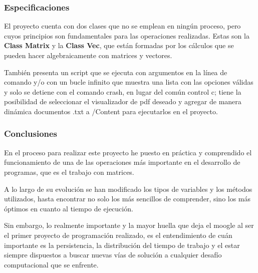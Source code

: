 \documentclass{beamer}
\begin{document}
\begin{frame}
    \frametitle{Especificaciones}
    El proyecto cuenta con dos clases que no se emplean en ningún proceso, pero cuyos principios son 
    fundamentales para las operaciones realizadas. Estas son la \textbf{Class Matrix} y  la \textbf{Class Vec},  que 
    están formadas por los cálculos que se pueden hacer algebraicamente con matrices y vectores.

    También presenta un script que se ejecuta con argumentos en la línea de comando y/o con un bucle infinito que 
    muestra una lista con las opciones válidas y solo se detiene con el comando crash, en lugar del común control c; 
    tiene la posibilidad de seleccionar el visualizador de pdf deseado y agregar de manera dinámica documentos .txt a 
    /Content para ejecutarlos en el proyecto.
\end{frame}

\begin{frame}
    \frametitle{Conclusiones}
    En el proceso para realizar este proyecto he puesto en práctica y comprendido el funcionamiento de una de las 
    operaciones más importante en el desarrollo de programas, que es el trabajo con matrices. 
    
    A lo largo de su evolución se han modificado los tipos de variables y los métodos utilizados, hasta encontrar no 
    solo los más sencillos de comprender, sino los más óptimos en cuanto al tiempo de ejecución.

    Sin embargo, lo realmente importante y la mayor huella que deja el moogle al ser el primer proyecto de programación 
    realizado, es el entendimiento de cuán importante es la persistencia, la distribución del tiempo de trabajo y el 
    estar siempre dispuestos a buscar nuevas vías de solución a cualquier desafío computacional que se enfrente.
\end{frame}
\end{document}
